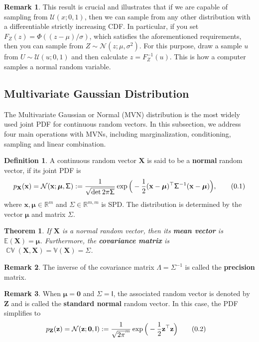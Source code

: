 \documentclass[10pt]{article}
\newtheorem{thm}{Theorem}[section]
\theoremstyle{definition}
\newtheorem{defn}{Definition}[section]
\newtheorem*{rem}{Remark}
\newcommand\eqnum{\addtocounter{equation}{1}\tag{\arabic{section}.\arabic{equation}}}
\DeclareMathOperator{\cov}{\mathbb{CV}}
\begin{document}
\newline
\begin{rem}
This result is crucial and illustrates that if we are capable of sampling from $\mathcal{U}(x; 0, 1)$, then we can sample from any other distribution with a differentiable strictly increasing CDF. In particular, if you set $F_Z(z) = \Phi((z-\mu)/\sigma)$, which satisfies the aforementioned requirements, then you can sample from $Z\sim\mathcal{N}(z; \mu, \sigma^2)$. For this purpose, draw a sample $u$ from $U\sim\mathcal{U}(u; 0, 1)$ and then calculate $z=F_Z^{-1}(u)$. This is how a computer samples a normal random variable.
\end{rem}

\subsection{Multivariate Gaussian Distribution}
The Multivariate Gaussian or Normal (MVN) distribution is the most widely used joint PDF for continuous random vectors. In this subsection, we address four main operations with MVNs, including marginalization, conditioning,  sampling and linear combination.
\begin{defn}
A continuous random vector $\mathbf{X}$ is said to be a \textbf{normal} random vector, if its joint PDF is
\begin{equation*}
p_{\mathbf{X}}(\mathbf{x}) = \mathcal{N}(\mathbf{x};\boldsymbol{\mu},\mathsf{\Sigma}) := 
\frac{1}{\sqrt{\det2\pi\mathsf{\Sigma}}}
\exp\Big(-\frac{1}{2}(\mathbf{x} - \boldsymbol{\mu})^{\top}\mathsf{\Sigma}^{-1}(\mathbf{x} - \boldsymbol{\mu})\Big),
\eqnum
\end{equation*}
where $\mathbf{x}, \boldsymbol{\mu} \in \mathbb{R}^m$ and $\mathsf{\Sigma} \in \mathbb{R}^{m,m}$ is SPD. The distribution is determined by the vector $\boldsymbol{\mu}$ and matrix $\mathsf{\Sigma}$. 
\end{defn}
\begin{thm}
If $\mathbf{X}$ is a normal random vector, then its \textbf{mean vector} is $\mathbb{E}(\mathbf{X})=\boldsymbol{\mu}$. Furthermore, the \textbf{covariance matrix} is $\cov(\mathbf{X}, \mathbf{X})=\mathbb{V}(\mathbf{X})=\mathsf{\Sigma}$.
\end{thm}
\begin{rem}
The inverse of the covariance matrix $\mathsf{\Lambda} = \mathsf{\Sigma}^{-1}$ is called the \textbf{precision} matrix.
\end{rem}
\begin{rem}
When $\boldsymbol{\mu} = \mathbf{0}$ and $\mathsf{\Sigma} = \mathsf{I}$, the associated random vector is denoted by $\mathbf{Z}$ and is called the \textbf{standard normal}  random vector. In this case, the PDF simplifies to
\begin{align*}
p_{\mathbf{Z}}(\mathbf{z}) &=  \mathcal{N}(\mathbf{z};\boldsymbol{0},\mathsf{I}) := \frac{1}{\sqrt{2\pi}^m}
\exp\Big(-\frac{1}{2}\mathbf{z}^{\top}\mathbf{z}\Big)
\eqnum
\end{align*}
\end{rem}
\end{document}

